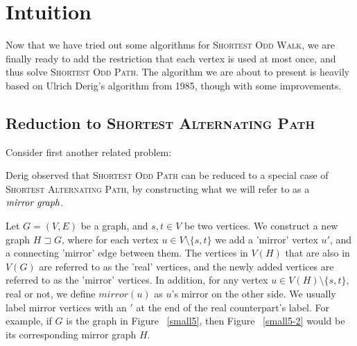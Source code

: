 \section{Intuition}
Now that we have tried out some algorithms for \textsc{Shortest Odd Walk}, we are finally ready to add the restriction that each vertex is used at most once, and thus solve \textsc{Shortest Odd Path}. The algorithm we are about to present is heavily based on Ulrich Derig's algorithm from 1985, though with some improvements.

\subsection{Reduction to \textsc{Shortest Alternating Path}}
Consider first another related problem:


Derig observed that \textsc{Shortest Odd Path} can be reduced to a special case of \textsc{Shortest Alternating Path}, by constructing what we will refer to as a $\emph{mirror graph}$.

\begin{definition}
    Let $G = (V, E)$ be a graph, and $s,t \in V$ be two vertices.
    We construct a new graph $H \sqsupset G$, where for each vertex $u \in V \setminus \{s,t\}$ we add a 'mirror' vertex $u'$, and a connecting 'mirror' edge between them. 
    The vertices in $V(H)$ that are also in $V(G)$ are referred to as the 'real' vertices, and the newly added vertices are referred to as the 'mirror' vertices. In addition, for any vertex $u \in V(H) \setminus \{s,t\}$, real or not, we define $mirror(u)$ as $u$'s mirror on the other side. We usually label mirror vertices with an $'$ at the end of the real counterpart's label.
    For example, if $G$ is the graph in Figure ~\ref{small5}, then Figure ~\ref{small5-2} would be its corresponding mirror graph $H$.
\end{definition}

